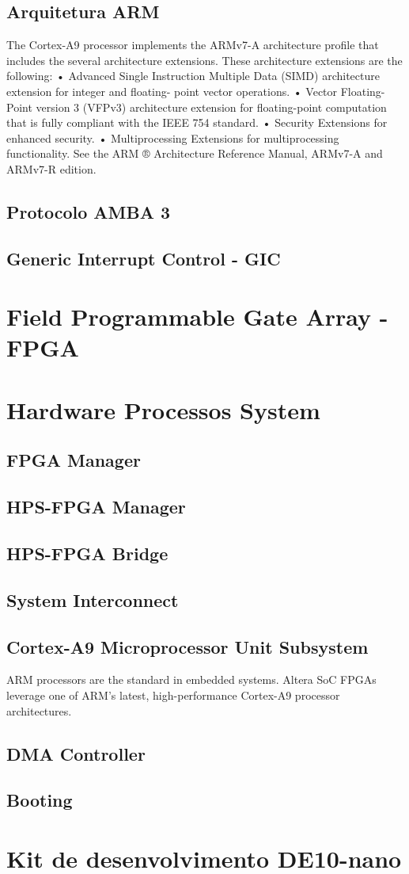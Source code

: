 \subsection{Arquitetura ARM}
The Cortex-A9 processor implements the ARMv7-A architecture profile that includes the several
architecture extensions.
These architecture extensions are the following:
• Advanced Single Instruction Multiple Data (SIMD) architecture extension for integer and floating-
point vector operations.
• Vector Floating-Point version 3 (VFPv3) architecture extension for floating-point computation that is
fully compliant with the IEEE 754 standard.
• Security Extensions for enhanced security.
• Multiprocessing Extensions for multiprocessing functionality.
See the ARM ® Architecture Reference Manual, ARMv7-A and ARMv7-R edition.

\subsection{Protocolo AMBA 3}
\subsection{Generic Interrupt Control - GIC}

\section{Field Programmable Gate Array - FPGA}


\section{Hardware Processos System}
\subsection{FPGA Manager}
\subsection{HPS-FPGA Manager}
\subsection{HPS-FPGA Bridge}
\subsection{System Interconnect}
\subsection{Cortex-A9 Microprocessor Unit Subsystem}
ARM processors are the standard in embedded systems. Altera SoC FPGAs leverage one of ARM's latest, high-performance Cortex-A9 processor architectures.
\subsection{DMA Controller }
\subsection{Booting}


\section{Kit de desenvolvimento DE10-nano}